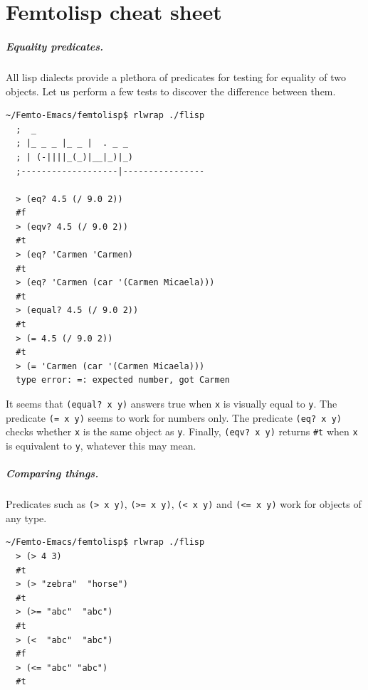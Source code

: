 \documentclass[a4paper,12pt]{book}
\begin{document}
\appendix

\chapter{Femtolisp cheat sheet}

\paragraph{Equality predicates.}
All lisp dialects provide a plethora
of predicates for testing for equality
of two objects. Let us perform a few tests
to discover the difference between them.

\begin{Verbatim}[fontsize=\small,
    frame=single]
  ~/Femto-Emacs/femtolisp$ rlwrap ./flisp
  ;  _
  ; |_ _ _ |_ _ |  . _ _
  ; | (-||||_(_)|__|_)|_)
  ;-------------------|----------------

  > (eq? 4.5 (/ 9.0 2))
  #f
  > (eqv? 4.5 (/ 9.0 2))
  #t
  > (eq? 'Carmen 'Carmen)
  #t
  > (eq? 'Carmen (car '(Carmen Micaela)))
  #t
  > (equal? 4.5 (/ 9.0 2))
  #t
  > (= 4.5 (/ 9.0 2))
  #t
  > (= 'Carmen (car '(Carmen Micaela)))
  type error: =: expected number, got Carmen
\end{Verbatim}
It seems that \verb|(equal? x y)| answers true
when \verb|x| is visually equal to \verb|y|.
The predicate \verb|(= x y)| seems to work
for numbers only. The predicate \verb|(eq? x y)|
checks whether \verb|x| is the same object as \verb|y|.
Finally, \verb|(eqv? x y)| returns \verb|#t| when
\verb|x| is equivalent to \verb|y|, whatever this
may mean.

\paragraph{Comparing things.}
Predicates such as \verb|(> x y)|,
\verb|(>= x y)|, \verb|(< x y)| and \verb|(<= x y)|
work for objects of any type.

\begin{Verbatim}[fontsize=\small,
    frame=single]
  ~/Femto-Emacs/femtolisp$ rlwrap ./flisp
  > (> 4 3)
  #t
  > (> "zebra"  "horse")
  #t
  > (>= "abc"  "abc")
  #t
  > (<  "abc"  "abc")
  #f
  > (<= "abc" "abc")
  #t
\end{Verbatim}
\end{document}
